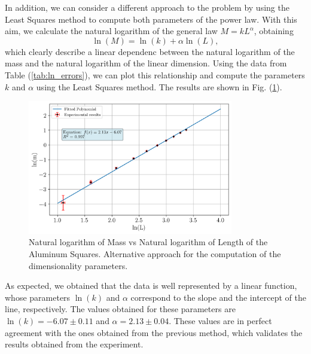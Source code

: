 \documentclass[a4paper,12pt]{article}
\begin{document}
In addition, we can consider a different approach to the problem by using the Least Squares method to compute both parameters of the power law. With this aim, we calculate 
the natural logarithm of the general law $M = k L^{\alpha}$, obtaining 
\begin{equation}
    \ln(M) = \ln(k) + \alpha \ln(L),
\end{equation}
which clearly describe a linear dependenc between the natural logarithm of the mass and the natural logarithm of the linear dimension. Using the data from Table (\ref{tab:ln_errors}), we can plot this relationship and compute the parameters $k$ and $\alpha$ using the Least Squares method. The results are shown in Fig. (\ref{fig:ln_mass_vs_ln_length}).
\begin{figure}[h!]
    \centering
    \includegraphics[width = 0.8\textwidth]{ln_mass_vs_ln_length.png}
    \caption{Natural logarithm of Mass vs Natural logarithm of Length of the Aluminum Squares. Alternative approach for the computation of the dimensionality parameters.}
    \label{fig:ln_mass_vs_ln_length}
\end{figure}

As expected, we obtained that the data is well represented by a linear function, whose parameters $\ln(k)$ and $\alpha$ correspond to the slope and the intercept of the line, respectively. The values obtained for these parameters are $\ln(k) = -6.07 \pm 0.11$ and $\alpha = 2.13 \pm  0.04$. These values are in perfect agreement with the ones obtained from the previous method, which validates the results obtained from the experiment.
\end{document}

